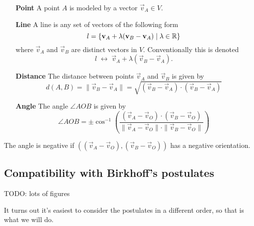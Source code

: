 \begin{note}
\begin{enumerate}
\item[\textbf{Point}] A point $A$ is modeled by a vector $\vec{v}_A \in V$.
\item[\textbf{Line}] A line is any set of vectors of the following form
\[ l = \{ \bm{\mathrm{v}}_A + \lambda(\bm{\mathrm{v}}_B - \bm{\mathrm{v}}_A) \;|\; \lambda \in \mathbb{R}\} \]
where $\vec{v}_A$ and $\vec{v}_B$ are distinct vectors in $V$. Conventionally this is denoted
\[ l \; \leftrightarrow \; \vec{v}_A + \lambda(\vec{v}_B - \vec{v}_A). \]
\item[\textbf{Distance}] The distance between points $\vec{v}_A$ and $\vec{v}_B$ is given by
\[ d(A,B) = \lVert \vec{v}_B - \vec{v}_A \lVert = \sqrt{(\vec{v}_B - \vec{v}_A)\cdot (\vec{v}_B - \vec{v}_A)} \]
\item[\textbf{Angle}] The angle $\angle AOB$ is given by
\[ \angle AOB = \pm\cos^{-1}\left(\frac{(\vec{v}_A- \vec{v}_O)\cdot (\vec{v}_B- \vec{v}_O)}{\lVert \vec{v}_A - \vec{v}_O\lVert\cdot\lVert \vec{v}_B- \vec{v}_O\lVert}\right) \]
\end{enumerate}
The angle is negative if $\left((\vec{v}_A- \vec{v}_O), (\vec{v}_B- \vec{v}_O)\right)$ has a negative orientation.
\end{note}

\subsection{Compatibility with Birkhoff's postulates}
TODO: lots of figures

It turns out it's easiest to consider the postulates in a different order, so that is what we will do.

